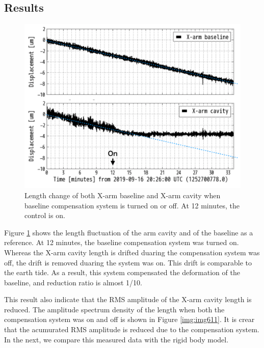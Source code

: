 \subsection{Results}
\begin{figure}[h]
  \centering
  \includegraphics[width=12cm]{./img_chap6/img610.png}
  \caption{Length change of both X-arm baseline and X-arm cavity when baseline compensation system is turned on or off. At 12 minutes, the control is on.}\label{img:img610}
\end{figure}

Figure \ref{img:img610} shows the length fluctuation of the arm cavity and of the baseline as a reference. At 12 minutes, the baseline compensation system was turned on. Whereas the X-arm cavity length is drifted duaring the compensation system was off, the drift is removed duaring the system was on. This drift is comparable to the earth tide. As a result, this system compensated the deformation of the baseline, and reduction ratio is almost 1/10.

This result also indicate that the RMS amplitude of the X-arm cavity length is reduced. The amplitude spectrum density of the length when both the compensation system was on and off is shown in Figure \ref{img:img611}. It is crear that the acumurated RMS amplitude is reduced due to the compensation system. In the next, we compare this measured data with the rigid body model.

